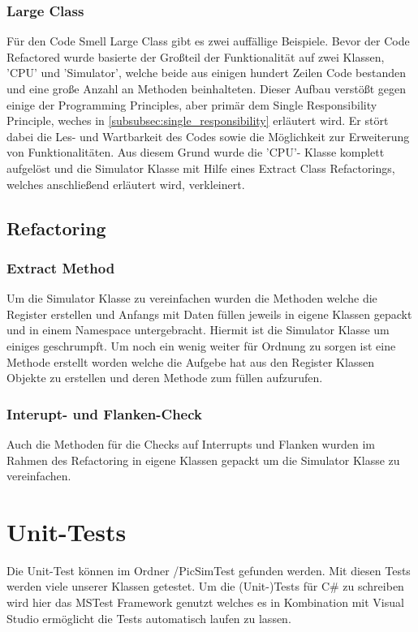\documentclass[12pt,a4paper,titlepage,ngerman,pdftex]{report}
\begin{document}
	\subsubsection{Large Class}
	Für den Code Smell Large Class gibt es zwei auffällige Beispiele. Bevor der Code Refactored wurde basierte der Großteil der Funktionalität auf zwei Klassen, 'CPU' und 'Simulator', welche beide aus einigen hundert Zeilen Code bestanden und eine große Anzahl an Methoden beinhalteten.
	Dieser Aufbau verstößt gegen einige der Programming Principles, aber primär dem Single Responsibility Principle, weches in \autoref{subsubsec:single_responsibility} erläutert wird. Er stört dabei die Les- und Wartbarkeit des Codes sowie die Möglichkeit zur Erweiterung von Funktionalitäten.
	Aus diesem Grund wurde die 'CPU'- Klasse komplett aufgelöst und die  Simulator Klasse mit Hilfe eines Extract Class Refactorings, welches anschließend erläutert wird, verkleinert.
	
	\subsection{Refactoring}
	\subsubsection{Extract Method}
	Um die Simulator Klasse zu vereinfachen wurden die Methoden welche die Register erstellen und Anfangs mit Daten füllen jeweils in eigene Klassen gepackt und in einem Namespace untergebracht.
	Hiermit ist die Simulator Klasse um einiges geschrumpft.
	Um noch ein wenig weiter für Ordnung zu sorgen ist eine Methode erstellt worden welche die Aufgebe hat aus den Register Klassen Objekte zu erstellen und deren Methode zum füllen aufzurufen. 
	
	\subsubsection{Interupt- und Flanken-Check}
	Auch die Methoden für die Checks auf Interrupts und Flanken wurden im Rahmen des Refactoring in eigene Klassen gepackt um die Simulator Klasse zu vereinfachen.
	
	
	\section{Unit-Tests}
	Die Unit-Test können im Ordner /PicSimTest gefunden werden. 
	Mit diesen Tests werden viele unserer Klassen getestet.
	Um die (Unit-)Tests für C\# zu schreiben wird hier das MSTest Framework genutzt welches es in Kombination mit Visual Studio ermöglicht die Tests automatisch laufen zu lassen.
	
\end{document}
